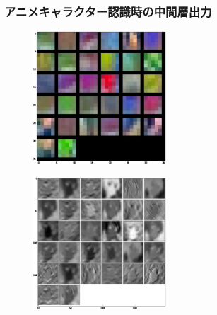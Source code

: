 \documentclass[dvipdfmx,11pt,notheorems]{beamer}
\theoremstyle{definition}
\begin{document}
\begin{frame}\frametitle{アニメキャラクター認識時の中間層出力}
\begin{figure}[t]
 \begin{minipage}{0.45\hsize}
  \centering
  \includegraphics[width=50mm]{./fig/eps/filtereri.eps} \\
 \end{minipage}
 \begin{minipage}{0.45\hsize}
  \centering
  \includegraphics[width=50mm]{./fig/eps/outputeri.eps}\\
 \end{minipage}
\end{figure}
\end{frame}
\end{document}
